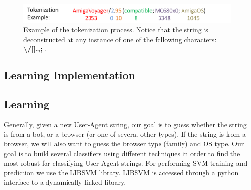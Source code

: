 \documentclass[10pt]{article}
\begin{document}
\begin{figure}
\includegraphics[width=6in]{token_figure.png}
\caption{Example of the tokenization process.  Notice that the string is deconstructed at any instance of one of the following characters: {\bf \textbackslash /[].,;}  .}
\end{figure}


\subsection{Learning Implementation}
\subsection{Learning}
Generally, given a new User-Agent string, our goal is to guess whether the string is from a bot, or a browser (or one of several other types).  If the string is from a browser, we will also want to guess the browser type (family) and OS type.    Our goal is to build several classifiers using different techniques in order to find the most robust for classifying User-Agent strings.  For performing SVM training and prediction we use the LIBSVM library.\cite{libsvm}  LIBSVM is accessed through a python interface to a dynamically linked library. 
\end{document}
